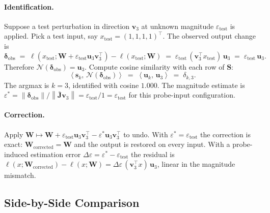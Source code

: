 \documentclass[11pt,a4paper]{article}
\theoremstyle{definition}
\newcommand{\Wm}{\mathbf{W}}
\newcommand{\Sm}{\mathbf{S}}
\newcommand{\Jm}{\mathbf{J}}
\newcommand{\vk}[1][]{\mathbf{v}_{#1}}
\newcommand{\uk}[1][]{\mathbf{u}_{#1}}
\newcommand{\sk}[1][]{\mathbf{s}_{#1}}
\newcommand{\Nop}{\mathcal{N}}
\newcommand{\norm}[1]{\left\lVert#1\right\rVert}
\newcommand{\inner}[2]{\left\langle#1,\,#2\right\rangle}
\begin{document}
\paragraph{Identification.}
Suppose a test perturbation in direction $\vk[3]$ at unknown magnitude $\varepsilon_{\mathrm{test}}$ is applied. Pick a test input, say $x_{\mathrm{test}} = (1, 1, 1, 1)^\top$. The observed output change is
\[
  \boldsymbol{\delta}_{\mathrm{obs}}
  \;=\; \ell(x_{\mathrm{test}}; \Wm + \varepsilon_{\mathrm{test}}\uk[3]\vk[3]^\top)
       - \ell(x_{\mathrm{test}}; \Wm)
  \;=\; \varepsilon_{\mathrm{test}}\,(\vk[3]^\top x_{\mathrm{test}})\,\uk[3]
  \;=\; \varepsilon_{\mathrm{test}}\,\uk[3] .
\]
Therefore $\Nop(\boldsymbol{\delta}_{\mathrm{obs}}) = \uk[3]$. Compute cosine similarity with each row of $\Sm$:
\[
  \inner{\sk[k]}{\Nop(\boldsymbol{\delta}_{\mathrm{obs}})}
  \;=\; \inner{\uk[k]}{\uk[3]}
  \;=\; \delta_{k,3} .
\]
The argmax is $k = 3$, identified with cosine $1.000$. The magnitude estimate is $\varepsilon^* = \norm{\boldsymbol{\delta}_{\mathrm{obs}}} / \norm{\bar{\Jm}\vk[3]} = \varepsilon_{\mathrm{test}} / 1 = \varepsilon_{\mathrm{test}}$ for this probe-input configuration.

\paragraph{Correction.}
Apply $\Wm \mapsto \Wm + \varepsilon_{\mathrm{test}}\uk[3]\vk[3]^\top - \varepsilon^*\uk[3]\vk[3]^\top$ to undo. With $\varepsilon^* = \varepsilon_{\mathrm{test}}$ the correction is exact: $\Wm_{\mathrm{corrected}} = \Wm$ and the output is restored on every input. With a probe-induced estimation error $\Delta\varepsilon = \varepsilon^* - \varepsilon_{\mathrm{test}}$ the residual is $\ell(x;\Wm_{\mathrm{corrected}}) - \ell(x;\Wm) = \Delta\varepsilon\,(\vk[3]^\top x)\,\uk[3]$, linear in the magnitude mismatch.

\subsection{Side-by-Side Comparison}
\label{sec:appB_compare}
\end{document}
